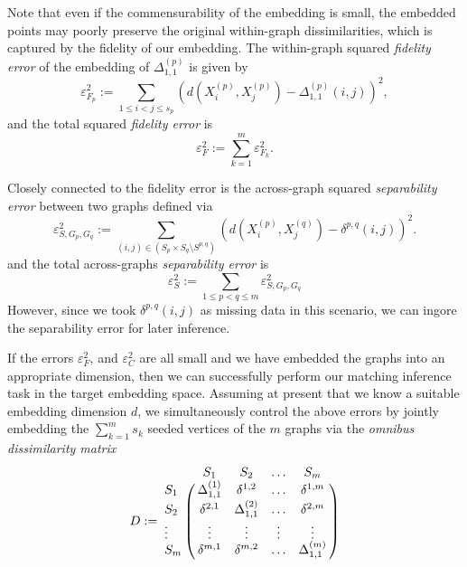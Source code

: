 \documentclass[12pt]{article}
\numberwithin{equation}{section}
\theoremstyle{definition}
\newcommand{\gD}{{\Delta}}
\begin{document}
Note that even if the commensurability of the embedding is small, the embedded points may poorly preserve the original within-graph dissimilarities, which is captured by the fidelity of our embedding.
The within-graph squared {\it fidelity error} of the embedding of $\gD^{(p)}_{1,1}$ is given by
\begin{equation}
\label{eq:fid-p}
\varepsilon^2_{F_p}:=\sum_{1\leq i< j\leq s_p}\left(d(X^{(p)}_i,X^{(p)}_j)-\gD^{(p)}_{1,1}(i,j)\right)^2,
\end{equation}
and the total squared {\it fidelity error} is
\begin{equation}
\label{eq:fid}
\varepsilon^2_{F}:=\sum\limits_{k=1}^{m}\varepsilon^2_{F_k}.
\end{equation}


Closely connected to the fidelity error is the across-graph squared {\it separability error} between two graphs defined via
\begin{equation}
\label{eq:sep_two}
\varepsilon^2_{S, G_p, G_q}:=\sum\limits_{(i,j)\in ( S_p \times S_q \setminus S^{p,q})}\left(d(X^{(p)}_{i},X^{(q)}_{j})-\delta^{p,q}(i,j)\right)^2.
\end{equation}
and the total across-graphs {\it separability error} is
\begin{equation}
\label{eq:sep}
\varepsilon^2_{S}:=\sum\limits_{1 \leq p < q \leq m} \varepsilon^2_{S, G_p, G_q}
\end{equation}
However, since we took $\delta^{p,q}(i, j)$ as missing data in this scenario, we can ingore the separability error for later inference. %


If the errors $\varepsilon^2_{F}$, and $\varepsilon^2_{C}$ are all small and we have embedded the graphs into an appropriate dimension, then we can successfully perform our matching inference task in the target embedding space.
Assuming at present that we know a suitable embedding dimension $d$, we simultaneously control the above errors by jointly embedding the $\sum\limits_{k=1}^{m} s_k$ seeded vertices of the $m$ graphs via the {\it omnibus dissimilarity matrix}
\begin{equation}
\label{eq:omni}
D:=\bordermatrix{&S_1 &S_2 &\ldots &S_m \cr
                 S_1&\gD^{(1)}_{1,1} & \delta^{1,2}      &\ldots     &\delta^{1,m}  \cr
                 S_2&\delta^{2,1}    & \gD^{(2)}_{1,1}   &\ldots     &\delta^{2,m}  \cr
                 \vdots&\vdots       & \vdots            &\vdots     &\vdots        \cr
                 S_m   &\delta^{m,1}  & \delta^{m,2}      &\ldots     &\gD^{(m)}_{1,1}
                 }
\end{equation}
\end{document}
